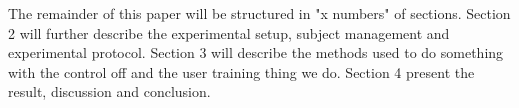 
The remainder of this paper will be structured in "x numbers" of sections. Section 2 will further describe the experimental setup, subject management and experimental protocol. Section 3 will describe the methods used to do something with the control off and the user training thing we do. Section 4 present the result, discussion and conclusion. 

